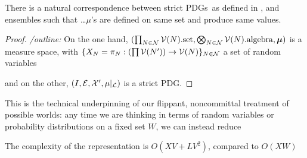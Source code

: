 \documentclass{article}
\newcommand{\bmu}{\boldsymbol{\mu}}
\newcommand{\Ed}{\mathcal E}
\newcommand{\MN}{PDG}
\newcommand{\MNs}{\MN s}
\numberwithin{equation}{section}
\begin{document}
	
	\begin{prop}
		There is a natural correspondence between strict \MNs\ as defined in , and ensembles such that  \ldots $\mu$'s are defined on same set and produce same values.
	\end{prop}
	\begin{proof}
		\textit{/outline:}
		On the one hand, $(\prod_{N \in \cal N} \mathcal V(N).\text{set}, \bigotimes_{N \in \cal N} \mathcal V(N).\text{algebra}, \bmu)$ is a measure space, with $\{X_N = \pi_N : \left(\prod\mathcal V(N')\right) \to  \mathcal V(N) \}_{N \in \cal N}$ a set of random variables
		
		and  on the other, $(I, \Ed, \mathcal X', \mu|_{\cal L})$ is a strict \MN.
	\end{proof}
	
	This is the technical underpinning of our flippant, noncommittal treatment of possible worlds: any time we are thinking in terms of random variables or probability distributions on a fixed set $W$, we can instead reduce
	
	
	The complexity of the representation is $O(XV + L V^2)$, compared to $O(XW)$
	
\end{document}
